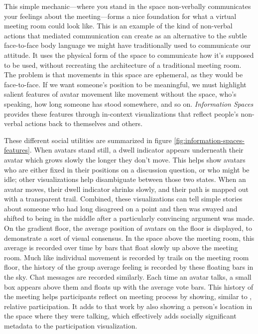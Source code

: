 \documentclass{tufte-handout}
\begin{document}
This simple mechanic---where you stand in the space non-verbally communicates your feelings about the meeting---forms a nice foundation for what a virtual meeting room could look like. This is an example of the kind of non-verbal actions that mediated communication can create as an alternative to the subtle face-to-face body language we might have traditionally used to communicate our attitude. It uses the physical form of the space to communicate how it's supposed to be used, without recreating the architecture of a traditional meeting room. The problem is that movements in this space are ephemeral, as they would be face-to-face. If we want someone's position to be meaningful, we must highlight salient features of avatar movement like movement without the space, who's speaking, how long someone has stood somewhere, and so on. \emph{Information Spaces} provides these features through in-context visualizations that reflect people's non-verbal actions back to themselves and others. 


These different social utilities are summarized in figure \ref{fig:information-spaces-features}. When avatars stand still, a dwell indicator appears underneath their avatar which grows slowly the longer they don't move. This helps show avatars who are either fixed in their positions on a discussion question, or who might be idle; other visualizations help disambiguate between those two states. When an avatar moves, their dwell indicator shrinks slowly, and their path is mapped out with a transparent trail. Combined, these visualizations can tell simple stories about someone who had long disagreed on a point and then was swayed and shifted to being in the middle after a particularly convincing argument was made. On the gradient floor, the average position of avatars on the floor is displayed, to demonstrate a sort of visual consensus. In the space above the meeting room, this average is recorded over time by bars that float slowly up above the meeting room. Much like individual movement is recorded by trails on the meeting room floor, the history of the group average feeling is recorded by these floating bars in the sky. Chat messages are recorded similarly. Each time an avatar talks, a small box appears above them and floats up with the average vote bars. This history of the meeting helps participants reflect on meeting process by showing, similar to \citep{DiMicco:2007ie}, relative participation. It adds to that work by also showing a person's location in the space where they were talking, which effectively adds socially significant metadata to the participation visualization.
\end{document}

